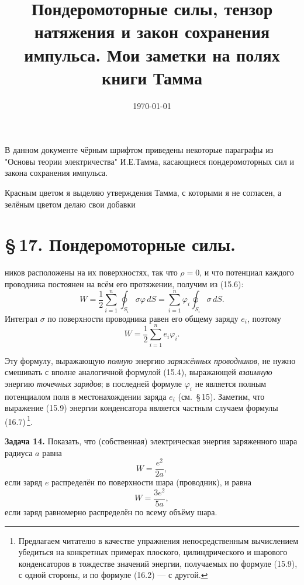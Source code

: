 \documentclass[a4paper,10pt]{article}
\title{\textbf{Пондеромоторные силы, тензор натяжения и закон сохранения импульса. Мои заметки на полях книги Тамма}}
\author{}
\date{\today}
\begin{document}
    \maketitle

В данном документе чёрным шрифтом приведены некоторые параграфы из "Основы теории электричества"
И.Е.Тамма, касающиеся пондеромоторных сил и закона сохранения импульса.

Красным цветом я выделяю утверждения Тамма, с которыми я не согласен, а зелёным цветом делаю свои добавки


\section*{\S\,17. Пондеромоторные силы.}


ников расположены на их поверхностях, так что $\rho = 0$, и что
потенциал каждого проводника постоянен на всём его протяжении,
получим из (15.6):
$$
    W = \frac{1}{2}\sum_{i=1}^n\oint_{S_i}\sigma\varphi\,dS
      = \sum_{i=1}^n\varphi_i\oint_{S_i}\sigma\,dS.
$$
Интеграл $\sigma$ по поверхности проводника равен его общему заряду
$e_i$, поэтому
\begin{equation}
    W = \frac{1}{2}\sum_{i=1}^n e_i\varphi_i.
    \tag{16.7}
\end{equation}

Эту формулу, выражающую \textit{полную} энергию \textit{заряжённых
проводников}, не нужно смешивать с вполне аналогичной формулой (15.4),
выражающей \textit{взаимную} энергию \textit{точечных зарядов}; в
последней формуле $\varphi_i$ не является полным потенциалом поля
в местонахождении заряда $e_i$ (см.\ §\,15). Заметим, что выражение
(15.9) энергии конденсатора является частным случаем формулы (16.7)\,\footnote{Предлагаем
читателю в качестве упражнения непосредственным вычислением убедиться
на конкретных примерах плоского, цилиндрического и шарового конденсаторов
в тождестве значений энергии, получаемых по формуле (15.9), с одной
стороны, и по формуле (16.2) — с другой.}.

\textbf{Задача 14.} Показать, что (собственная) электрическая энергия
заряженного шара радиуса $a$ равна
$$
    W = \frac{e^2}{2a},
$$
если заряд $e$ распределён по поверхности шара (проводник), и равна
$$
    W = \frac{3e^2}{5a},
$$
если заряд равномерно распределён по всему объёму шара.
\end{document}
